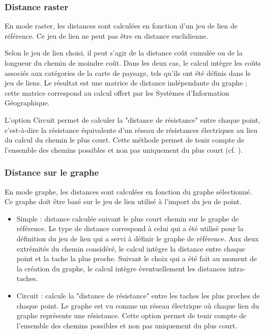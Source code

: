 \documentclass{article}
\begin{document}
\subsubsection{Distance raster}
En mode raster, les distances sont calculées en fonction d'un jeu de lien de référence. Ce jeu de lien ne peut pas être en distance euclidienne.

Selon le jeu de lien choisi, il peut s’agir de la distance coût cumulée ou de la longueur du chemin de moindre coût. Dans les deux cas, le calcul intègre les coûts associés aux catégories de la carte de paysage, tels qu’ils ont été définis dans le jeu de liens. Le résultat est une matrice de distance indépendante du graphe ; cette matrice correspond au calcul offert par les Systèmes d’Information Géographique.

L'option Circuit permet de calculer la "distance de résistance" entre chaque point, c'est-à-dire la résistance équivalente d'un réseau de résistances électriques au lieu du calcul du chemin le plus court. Cette méthode permet de tenir compte de l'ensemble des chemins possibles et non pas uniquement du plus court (cf. \cite{McRae2008}).


\subsubsection{Distance sur le graphe}

En mode graphe, les distances sont calculées en fonction du graphe sélectionné. Ce graphe doit être basé sur le jeu de lien utilisé à l'import du jeu de point.

\begin{itemize}
	\item Simple : distance calculée suivant le plus court chemin sur le graphe de référence. Le type de distance correspond à celui qui a été utilisé pour la définition du jeu de lien qui a servi à définir le graphe de référence. Aux deux extrémités du chemin considéré, le calcul intègre la distance entre chaque point et la tache la plus proche. Suivant le choix qui a été fait au moment de la création du graphe, le calcul intègre éventuellement les distances intra-taches.	
	\item Circuit : calcule la "distance de résistance" entre les taches les plus proches de chaque point. Le graphe est vu comme un réseau électrique où chaque lien du graphe représente une résistance. Cette option permet de tenir compte de l'ensemble des chemins possibles et non pas uniquement du plus court.
\end{itemize}
\end{document}
